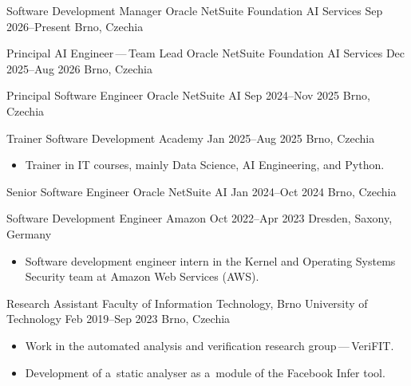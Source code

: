 \documentclass[10pt, a4paper, academicons]{altacv}
\begin{document}
\tagline{}

\begin{fullwidth}
    \makecvheader
\end{fullwidth}



\cvevent
{Software Development Manager}
{Oracle NetSuite Foundation AI Services}
{Sep 2026--Present}
{Brno, Czechia}
\medskip

\cvevent
{Principal AI Engineer\,---\,Team Lead}
{Oracle NetSuite Foundation AI Services}
{Dec 2025--Aug 2026}
{Brno, Czechia}
\medskip

\cvevent
{Principal Software Engineer}
{Oracle NetSuite AI}
{Sep 2024--Nov 2025}
{Brno, Czechia}
\medskip

\cvevent
{Trainer}
{Software Development Academy}
{Jan 2025--Aug 2025}
{Brno, Czechia}
\begin{itemize}\setlength{\itemindent}{.5em}\small
    \item[--] Trainer in IT courses, mainly Data Science, AI Engineering, and Python.
\end{itemize}
\smallskip

\cvevent
{Senior Software Engineer}
{Oracle NetSuite AI}
{Jan 2024--Oct 2024}
{Brno, Czechia}
\smallskip

\cvevent
{Software Development Engineer}
{Amazon}
{Oct 2022--Apr 2023}
{Dresden, Saxony, Germany}
\begin{itemize}\setlength{\itemindent}{.5em}\small
    \item[--] Software development engineer intern in the Kernel and Operating Systems Security team at Amazon Web Services (AWS).
\end{itemize}
\medskip

\cvevent
{Research Assistant}
{Faculty of Information Technology, Brno University of Technology}
{Feb 2019--Sep 2023}
{Brno, Czechia}
\begin{itemize}\setlength{\itemindent}{.5em}\small
    \item[--] Work in the automated analysis and verification research group\,---\,VeriFIT.

    \item[--] Development of a~static analyser as a~module of the Facebook Infer tool.
\end{itemize}
\medskip
\end{document}
